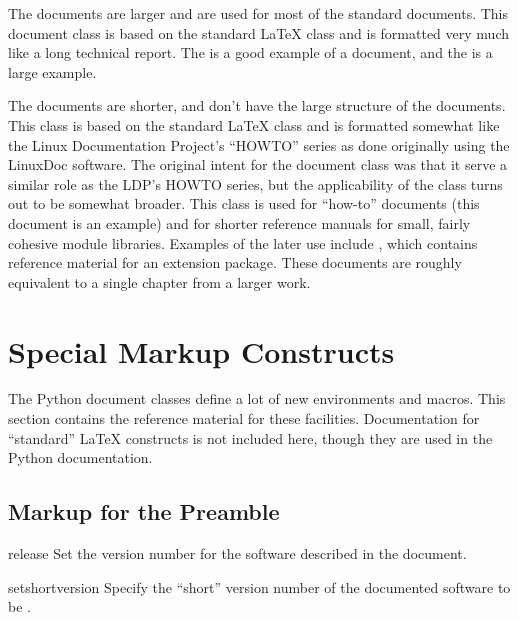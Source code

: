 \documentclass{howto}
\begin{document}
  The  documents are larger and are used for most of the
  standard documents.  This document class is based on the standard
  \LaTeX{}  class and is formatted very much like a long
  technical report.  The  is a good example of a  document, and the
   is a large
  example.

  The  documents are shorter, and don't have the large
  structure of the  documents.  This class is based on
  the standard \LaTeX{}  class and is formatted somewhat
  like the Linux Documentation Project's ``HOWTO'' series as done
  originally using the LinuxDoc software.  The original intent for the
  document class was that it serve a similar role as the LDP's HOWTO
  series, but the applicability of the class turns out to be somewhat
  broader.  This class is used for ``how-to'' documents (this
  document is an example) and for shorter reference manuals for small,
  fairly cohesive module libraries.  Examples of the later use include
, which contains reference material for an
  extension package.  These documents are roughly equivalent to a
  single chapter from a larger work.


\section{Special Markup Constructs \label{special-constructs}}

  The Python document classes define a lot of new environments and
  macros.  This section contains the reference material for these
  facilities.  Documentation for ``standard'' \LaTeX{} constructs is
  not included here, though they are used in the Python documentation.

  \subsection{Markup for the Preamble \label{preamble-info}}

    \begin{macrodesc}{release}{}
      Set the version number for the software described in the
      document.
    \end{macrodesc}

    \begin{macrodesc}{setshortversion}{}
      Specify the ``short'' version number of the documented software
      to be .
    \end{macrodesc}
\end{document}
